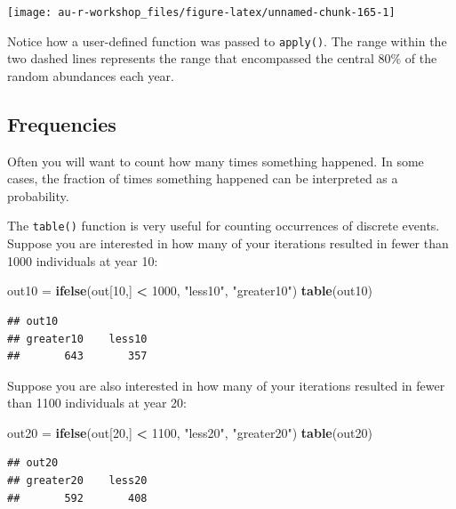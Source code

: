 \documentclass[]{book}
\newenvironment{Shaded}{\begin{snugshade}}{\end{snugshade}}
\newcommand{\KeywordTok}[1]{\textcolor[rgb]{0.13,0.29,0.53}{\textbf{#1}}}
\newcommand{\DecValTok}[1]{\textcolor[rgb]{0.00,0.00,0.81}{#1}}
\newcommand{\StringTok}[1]{\textcolor[rgb]{0.31,0.60,0.02}{#1}}
\newcommand{\OperatorTok}[1]{\textcolor[rgb]{0.81,0.36,0.00}{\textbf{#1}}}
\newcommand{\NormalTok}[1]{#1}
\theoremstyle{definition}
\theoremstyle{definition}
\theoremstyle{definition}
\theoremstyle{remark}
\begin{document}
\begin{center}\texttt{[image: au-r-workshop\_files/figure-latex/unnamed-chunk-165-1]} \end{center}

Notice how a user-defined function was passed to \texttt{apply()}. The
range within the two dashed lines represents the range that encompassed
the central 80\% of the random abundances each year.

\subsection{Frequencies}\label{frequencies}

Often you will want to count how many times something happened. In some
cases, the fraction of times something happened can be interpreted as a
probability.

The \texttt{table()} function is very useful for counting occurrences of
discrete events. Suppose you are interested in how many of your
iterations resulted in fewer than 1000 individuals at year 10:

\begin{Shaded}
\begin{Highlighting}[]
\NormalTok{out10 =}\StringTok{ }\KeywordTok{ifelse}\NormalTok{(out[}\DecValTok{10}\NormalTok{,] }\OperatorTok{<}\StringTok{ }\DecValTok{1000}\NormalTok{, }\StringTok{"less10"}\NormalTok{, }\StringTok{"greater10"}\NormalTok{)}
\KeywordTok{table}\NormalTok{(out10)}
\end{Highlighting}
\end{Shaded}

\begin{verbatim}
## out10
## greater10    less10 
##       643       357
\end{verbatim}

Suppose you are also interested in how many of your iterations resulted
in fewer than 1100 individuals at year 20:

\begin{Shaded}
\begin{Highlighting}[]
\NormalTok{out20 =}\StringTok{ }\KeywordTok{ifelse}\NormalTok{(out[}\DecValTok{20}\NormalTok{,] }\OperatorTok{<}\StringTok{ }\DecValTok{1100}\NormalTok{, }\StringTok{"less20"}\NormalTok{, }\StringTok{"greater20"}\NormalTok{)}
\KeywordTok{table}\NormalTok{(out20)}
\end{Highlighting}
\end{Shaded}

\begin{verbatim}
## out20
## greater20    less20 
##       592       408
\end{verbatim}
\end{document}
